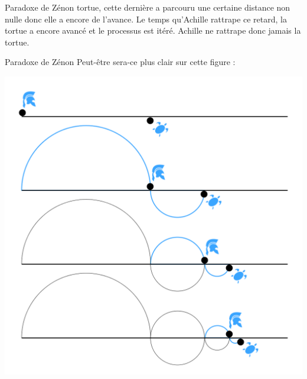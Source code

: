 \documentclass[11pt]{beamer}
\begin{document}
\begin{frame}{Paradoxe de Zénon}
tortue, cette dernière a parcouru une certaine distance non nulle donc elle a encore de l'avance. Le temps qu'Achille rattrape ce retard, la tortue a encore avancé et le processus est itéré. Achille ne rattrape donc jamais la tortue.
\end{frame}
\begin{frame}{Paradoxe de Zénon}
	Peut-être sera-ce plus clair sur cette figure : 
	\begin{center}
		\includegraphics[scale=0.2]{ZAPT1.png}
	\end{center}
\end{frame}
\end{document}
